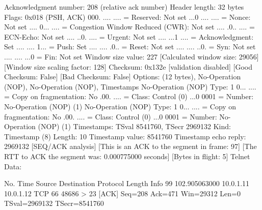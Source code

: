     Acknowledgment number: 208    (relative ack number)
    Header length: 32 bytes
    Flags: 0x018 (PSH, ACK)
        000. .... .... = Reserved: Not set
        ...0 .... .... = Nonce: Not set
        .... 0... .... = Congestion Window Reduced (CWR): Not set
        .... .0.. .... = ECN-Echo: Not set
        .... ..0. .... = Urgent: Not set
        .... ...1 .... = Acknowledgment: Set
        .... .... 1... = Push: Set
        .... .... .0.. = Reset: Not set
        .... .... ..0. = Syn: Not set
        .... .... ...0 = Fin: Not set
    Window size value: 227
    [Calculated window size: 29056]
    [Window size scaling factor: 128]
    Checksum: 0x132e [validation disabled]
        [Good Checksum: False]
        [Bad Checksum: False]
    Options: (12 bytes), No-Operation (NOP), No-Operation (NOP), Timestamps
        No-Operation (NOP)
            Type: 1
                0... .... = Copy on fragmentation: No
                .00. .... = Class: Control (0)
                ...0 0001 = Number: No-Operation (NOP) (1)
        No-Operation (NOP)
            Type: 1
                0... .... = Copy on fragmentation: No
                .00. .... = Class: Control (0)
                ...0 0001 = Number: No-Operation (NOP) (1)
        Timestamps: TSval 8541760, TSecr 2969132
            Kind: Timestamp (8)
            Length: 10
            Timestamp value: 8541760
            Timestamp echo reply: 2969132
    [SEQ/ACK analysis]
        [This is an ACK to the segment in frame: 97]
        [The RTT to ACK the segment was: 0.000775000 seconds]
        [Bytes in flight: 5]
Telnet
    Data: 

No.     Time           Source                Destination           Protocol Length Info
     99 102.905063000  10.0.1.11             10.0.1.12             TCP      66     48686 > 23 [ACK] Seq=208 Ack=471 Win=29312 Len=0 TSval=2969132 TSecr=8541760

